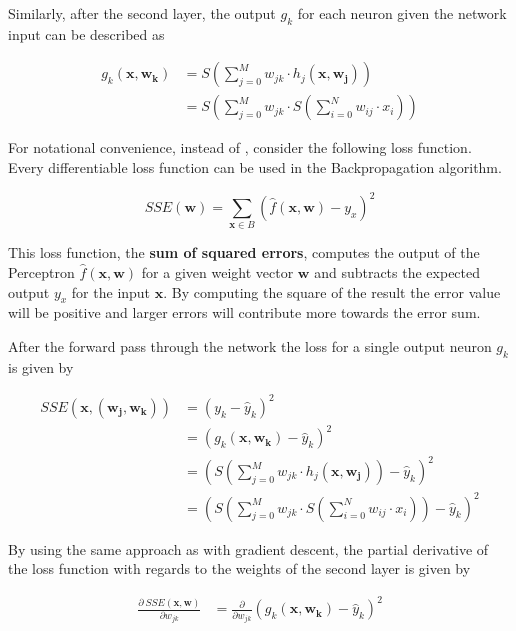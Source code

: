 Similarly, after the second layer, the output $g_k$ for each neuron given the network input can be described as

\begin{equation}
    \begin{split}
        g_k(\bm{x}, \bm{w_k})
        &= S\left(\sum_{j=0}^M w_{jk} \cdot h_j(\bm{x}, \bm{w_j})\right) \\
        &= S\left(\sum_{j=0}^M w_{jk} \cdot S \left(\sum_{i=0}^N w_{ij} \cdot x_i\right)\right)
    \end{split}
\end{equation}

For notational convenience, instead of , consider the following loss function.
Every differentiable loss function can be used in the Backpropagation algorithm.

\begin{equation}
    SSE(\bm{w}) = \sum_{\bm{x} \in B} (\hat{f}(\bm{x}, \bm{w}) - y_x)^2
\end{equation}

This loss function, the \textbf{sum of squared errors}, computes the output of the Perceptron $\hat{f}(\bm{x}, \bm{w})$ for a given weight vector $\bm{w}$ and subtracts the expected output $y_x$ for the input $\bm{x}$.
By computing the square of the result the error value will be positive and larger errors will contribute more towards the error sum.

After the forward pass through the network the loss for a single output neuron $g_k$ is given by

\begin{equation}
    \begin{split}
        SSE(\bm{x}, (\bm{w_j}, \bm{w_k}))
        &= (y_k - \hat{y}_{k})^2 \\
        &= (g_k(\bm{x},\bm{w_k}) - \hat{y}_{k})^2 \\
        &= \left(S \left(\sum_{j=0}^M w_{jk} \cdot h_j(\bm{x}, \bm{w_j})\right) - \hat{y}_{k}\right)^2 \\
        &=  \left( S\left(\sum_{j=0}^M w_{jk} \cdot S \left(\sum_{i=0}^N w_{ij} \cdot x_i\right)\right) - \hat{y}_{k}\right)^2
    \end{split}
\end{equation}

By using the same approach as with gradient descent, the partial derivative of the loss function with regards to the weights of the second layer is given by

\begin{equation}
    \begin{split}
        \frac{\partial ~ SSE(\bm{x}, \bm{w})}{\partial w_{jk}}
        &= \frac{\partial}{\partial w_{jk}} (g_k(\bm{x},\bm{w_k}) - \hat{y}_{k})^2
    \end{split}
\end{equation}

